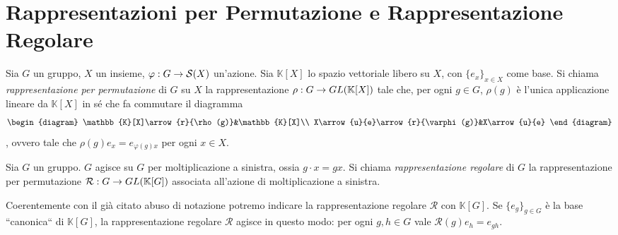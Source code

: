 \section{Rappresentazioni per Permutazione e Rappresentazione Regolare}

\begin{definition}
Sia $G$ un gruppo, $X$ un insieme, $\varphi:G\to \mathcal{S}(X)$ un'azione. Sia $\mathbb{K}[X]$ lo spazio vettoriale libero su $X$, con $\{e_x\}_{x\in X}$ come base. Si chiama \emph{rappresentazione per permutazione} di $G$ su $X$ la rappresentazione $\rho:G\to GL(\mathbb{K}[X])$ tale che, per ogni $g\in G$, $\rho(g)$ è l'unica applicazione lineare da $\mathbb{K}[X]$ in sé che fa commutare il diagramma
$$
\begin{diagram}
\mathbb{K}[X]\arrow{r}{\rho(g)}&\mathbb{K}[X]\\
X\arrow{u}{e}\arrow{r}{\varphi(g)}&X\arrow{u}{e}
\end{diagram}
$$
, ovvero tale che $\rho(g)e_x=e_{\varphi(g)x}$ per ogni $x\in X$.
\end{definition}

\begin{definition}
Sia $G$ un gruppo. $G$ agisce su $G$ per moltiplicazione a sinistra, ossia $g\cdot x=gx$. Si chiama \emph{rappresentazione regolare} di $G$ la rappresentazione per permutazione $\mathcal{R}:G\to GL(\mathbb{K}[G])$ associata all'azione di moltiplicazione a sinistra.
\end{definition}

Coerentemente con il già citato abuso di notazione potremo indicare la rappresentazione regolare $\mathcal{R}$ con $\mathbb{K}[G]$. Se $\{e_g\}_{g\in G}$ è la base ``canonica`` di $\mathbb{K}[G]$, la rappresentazione regolare $\mathcal{R}$ agisce in questo modo: per ogni $g,h\in G$ vale $\mathcal{R}(g)e_h=e_{gh}$.


